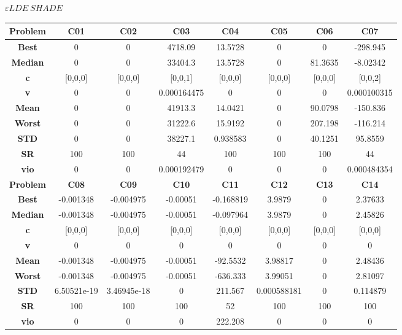 \documentclass{IEEEtran}
\begin{document}
\begin{center} 
$\varepsilon LDE\ SHADE$\\
  \begin{tabular}{|c|c|c|c|c|c|c|c|}
    \hline 
    \textbf{Problem} & \textbf{C01} & \textbf{C02} & \textbf{C03} & \textbf{C04} & \textbf{C05} & \textbf{C06} & \textbf{C07} \\ 
    \hline\hline 
    \textbf{Best} & 0 & 0 & 4718.09 & 13.5728 & 0 & 0 & -298.945\\ 
    \textbf{Median} & 0 & 0 & 33404.3 & 13.5728 & 0 & 81.3635 & -8.02342\\ 
    \textbf{c} & [0,0,0] & [0,0,0] & [0,0,1] & [0,0,0] & [0,0,0] & [0,0,0] & [0,0,2]\\ 
    \textbf{v} & 0 & 0 & 0.000164475 & 0 & 0 & 0 & 0.000100315\\ 
    \textbf{Mean} & 0 & 0 & 41913.3 & 14.0421 & 0 & 90.0798 & -150.836\\ 
    \textbf{Worst} & 0 & 0 & 31222.6 & 15.9192 & 0 & 207.198 & -116.214\\ 
    \textbf{STD} & 0 & 0 & 38227.1 & 0.938583 & 0 & 40.1251 & 95.8559\\ 
    \textbf{SR} & 100 & 100 & 44 & 100 & 100 & 100 & 44\\ 
    \textbf{vio} & 0 & 0 & 0.000192479 & 0 & 0 & 0 & 0.000484354\\ 
    \hline 
    \hline 
    \textbf{Problem} & \textbf{C08} & \textbf{C09} & \textbf{C10} & \textbf{C11} & \textbf{C12} & \textbf{C13} & \textbf{C14} \\ 
    \hline\hline 
    \textbf{Best} & -0.001348 & -0.004975 & -0.00051 & -0.168819 & 3.9879 & 0 & 2.37633\\ 
    \textbf{Median} & -0.001348 & -0.004975 & -0.00051 & -0.097964 & 3.9879 & 0 & 2.45826\\ 
    \textbf{c} & [0,0,0] & [0,0,0] & [0,0,0] & [0,0,0] & [0,0,0] & [0,0,0] & [0,0,0]\\ 
    \textbf{v} & 0 & 0 & 0 & 0 & 0 & 0 & 0\\ 
    \textbf{Mean} & -0.001348 & -0.004975 & -0.00051 & -92.5532 & 3.98817 & 0 & 2.48436\\ 
    \textbf{Worst} & -0.001348 & -0.004975 & -0.00051 & -636.333 & 3.99051 & 0 & 2.81097\\ 
    \textbf{STD} & 6.50521e-19 & 3.46945e-18 & 0 & 211.567 & 0.000588181 & 0 & 0.114879\\ 
    \textbf{SR} & 100 & 100 & 100 & 52 & 100 & 100 & 100\\ 
    \textbf{vio} & 0 & 0 & 0 & 222.208 & 0 & 0 & 0\\ 

\end{tabular}
\end{center}
\end{document}
